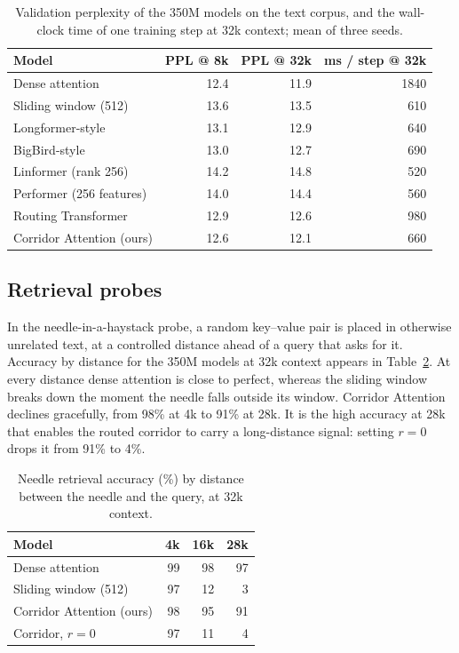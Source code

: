 \documentclass[11pt]{article}
\begin{document}
\begin{table}[t]
  \centering
  \begin{tabular}{lrrr}
    \toprule
    Model & PPL @ 8k & PPL @ 32k & ms / step @ 32k \\
    \midrule
    Dense attention           & 12.4 & 11.9 & 1840 \\
    Sliding window (512)      & 13.6 & 13.5 &  610 \\
    Longformer-style          & 13.1 & 12.9 &  640 \\
    BigBird-style             & 13.0 & 12.7 &  690 \\
    Linformer (rank 256)      & 14.2 & 14.8 &  520 \\
    Performer (256 features)  & 14.0 & 14.4 &  560 \\
    Routing Transformer       & 12.9 & 12.6 &  980 \\
    Corridor Attention (ours) & 12.6 & 12.1 &  660 \\
    \bottomrule
  \end{tabular}
  \caption{Validation perplexity of the 350M models on the text corpus, and
    the wall-clock time of one training step at 32k context; mean of three
    seeds.}
  \label{tab:main}
\end{table}

\subsection{Retrieval probes}\label{sec:probes}

In the needle-in-a-haystack probe, a random key--value pair is placed in
otherwise unrelated text, at a controlled distance ahead of a query that asks
for it. Accuracy by distance for the 350M models at 32k context appears in
Table~\ref{tab:needle}. At every distance dense attention is close to
perfect, whereas the sliding window breaks down the moment the needle falls
outside its window. Corridor Attention declines gracefully, from 98\% at 4k
to 91\% at 28k. It is the high accuracy at 28k that enables the routed
corridor to carry a long-distance signal: setting $r = 0$ drops it from 91\%
to 4\%.

\begin{table}[t]
  \centering
  \begin{tabular}{lrrr}
    \toprule
    Model & 4k & 16k & 28k \\
    \midrule
    Dense attention           & 99 & 98 & 97 \\
    Sliding window (512)      & 97 & 12 &  3 \\
    Corridor Attention (ours) & 98 & 95 & 91 \\
    Corridor, $r = 0$         & 97 & 11 &  4 \\
    \bottomrule
  \end{tabular}
  \caption{Needle retrieval accuracy (\%) by distance between the needle and
    the query, at 32k context.}
  \label{tab:needle}
\end{table}
\end{document}
